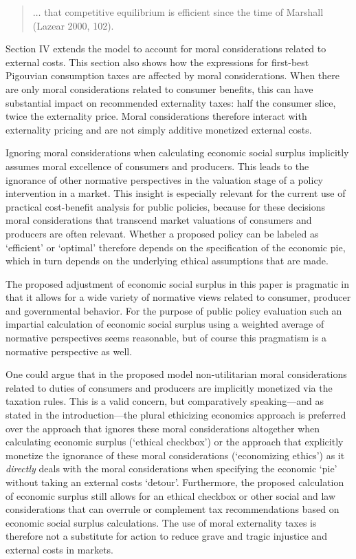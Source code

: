 \documentclass[
]{book}
\begin{document}
\begin{quote}
\(\ldots\) that competitive equilibrium is efficient since the time of Marshall (Lazear 2000, 102).
\end{quote}

Section IV extends the model to account for moral considerations related to external costs. This section also shows how the expressions for first-best Pigouvian consumption taxes are affected by moral considerations. When there are only moral considerations related to consumer benefits, this can have substantial impact on recommended externality taxes: half the consumer slice, twice the externality price. Moral considerations therefore interact with externality pricing and are not simply additive monetized external costs.

Ignoring moral considerations when calculating economic social surplus implicitly assumes moral excellence of consumers and producers. This leads to the ignorance of other normative perspectives in the valuation stage of a policy intervention in a market. This insight is especially relevant for the current use of practical cost-benefit analysis for public policies, because for these decisions moral considerations that transcend market valuations of consumers and producers are often relevant. Whether a proposed policy can be labeled as `efficient' or `optimal' therefore depends on the specification of the economic pie, which in turn depends on the underlying ethical assumptions that are made.

The proposed adjustment of economic social surplus in this paper is pragmatic in that it allows for a wide variety of normative views related to consumer, producer and governmental behavior. For the purpose of public policy evaluation such an impartial calculation of economic social surplus using a weighted average of normative perspectives seems reasonable, but of course this pragmatism is a normative perspective as well.

One could argue that in the proposed model non-utilitarian moral considerations related to duties of consumers and producers are implicitly monetized via the taxation rules. This is a valid concern, but comparatively speaking---and as stated in the introduction---the plural ethicizing economics approach is preferred over the approach that ignores these moral considerations altogether when calculating economic surplus (`ethical checkbox') or the approach that explicitly monetize the ignorance of these moral considerations (`economizing ethics') as it \emph{directly} deals with the moral considerations when specifying the economic `pie' without taking an external costs `detour'. Furthermore, the proposed calculation of economic surplus still allows for an ethical checkbox or other social and law considerations that can overrule or complement tax recommendations based on economic social surplus calculations. The use of moral externality taxes is therefore not a substitute for action to reduce grave and tragic injustice and external costs in markets.
\end{document}
